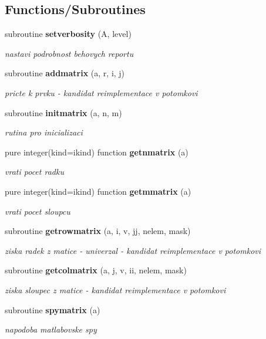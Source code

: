 \subsection*{Functions/\+Subroutines}
\begin{DoxyCompactItemize}
\item 
subroutine {\bf setverbosity} (A, level)
\begin{DoxyCompactList}\small\item\em nastavi podrobnost behovych reportu \end{DoxyCompactList}\item 
subroutine {\bf addmatrix} (a, r, i, j)
\begin{DoxyCompactList}\small\item\em pricte k prvku -\/ kandidat reimplementace v potomkovi \end{DoxyCompactList}\item 
subroutine {\bf initmatrix} (a, n, m)
\begin{DoxyCompactList}\small\item\em rutina pro inicializaci \end{DoxyCompactList}\item 
pure integer(kind=ikind) function {\bf getnmatrix} (a)
\begin{DoxyCompactList}\small\item\em vrati pocet radku \end{DoxyCompactList}\item 
pure integer(kind=ikind) function {\bf getmmatrix} (a)
\begin{DoxyCompactList}\small\item\em vrati pocet sloupcu \end{DoxyCompactList}\item 
subroutine {\bf getrowmatrix} (a, i, v, jj, nelem, mask)
\begin{DoxyCompactList}\small\item\em ziska radek z matice -\/ univerzal -\/ kandidat reimplementace v potomkovi \end{DoxyCompactList}\item 
subroutine {\bf getcolmatrix} (a, j, v, ii, nelem, mask)
\begin{DoxyCompactList}\small\item\em ziska sloupec z matice -\/ kandidat reimplementace v potomkovi \end{DoxyCompactList}\item 
subroutine {\bf spymatrix} (a)
\begin{DoxyCompactList}\small\item\em napodoba matlabovske spy \end{DoxyCompactList}\item 

\end{DoxyCompactItemize}
